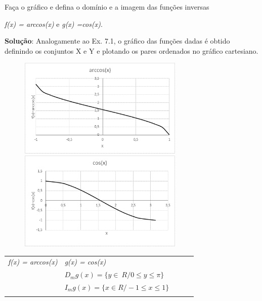 \begin{texemplo}
Faça o gráfico e defina o domínio e a imagem das funções inversas

\textit{f(x) = arccos(x) }e\textit{  g(x) =cos(x)}.

\textbf{Solução}: Analogamente ao Ex. 7.1, o gráfico das funções dadas é obtido definindo os conjuntos X e Y e plotando os pares ordenados no gráfico cartesiano.

\begin{figure}[H]
\begin{center}
    \includegraphics[width=0.70\textwidth]{capitulos/trigonometria_e_funcoes_trigonometricas/media/image49.png}
\end{center}
\begin{center}
	\includegraphics[width=0.70\textwidth]{capitulos/trigonometria_e_funcoes_trigonometricas/media/image50.png}
\end{center}
\end{figure}


\begin{table}[H]
             \centering
\begin{tabular}{p{0.96in}p{0.41in}p{0.39in}p{0.39in}p{0.39in}}
\hline
\multicolumn{1}{|p{2.10in}}{\centering\textit{f(x) = arccos(x)}} &
\multicolumn{1}{|p{2.10in}|}{\centering\textit{g(x) = cos(x)}} \\
\hhline{-----}
\multicolumn{1}{|p{2.10in}}{\centering\textit{$D_{m}f \left( x \right) = \{ x \in  R /-1  \leq x \leq 1 \}$}} &
\multicolumn{1}{|p{2.10in}|}{\centering\textit{$D_{m}g \left( x \right) = \{ y \in ~R  / 0  \leq  y  \leq   \pi\}$}}   \\
\hhline{-----}
\multicolumn{1}{|p{2.10in}}{\centering\textit{$I_{m}f \left( x \right) = \{ y \in ~R  / 0  \leq  y  \leq   \pi\}$}}  &
\multicolumn{1}{|p{2.10in}|}{\centering\textit{$I_{m}g \left( x \right) = \{ x \in  R /-1  \leq x \leq 1 \}$}} \\
\hhline{-----}
\end{tabular}
 \end{table}


\end{texemplo}
